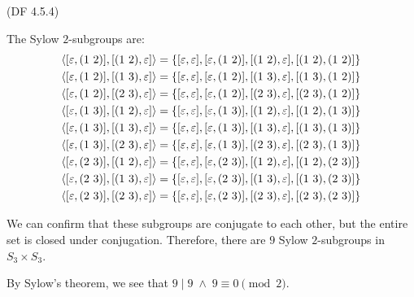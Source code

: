 \begin{problem}{(\textsf{DF 4.5.4})}
\begin{enumalph}
\begin{Answer}
\begin{enumalph}
\begin{enumalph}
                The Sylow $2$-subgroups are:
                \begin{align}
                  \langle [\varepsilon, (1\ 2)], [(1\ 2), \varepsilon] \rangle &= \{[\varepsilon, \varepsilon], [\varepsilon, (1\ 2)], [(1\ 2), \varepsilon], [(1\ 2), (1\ 2)] \} \\
                  \langle [\varepsilon, (1\ 2)], [(1\ 3), \varepsilon] \rangle &= \{[\varepsilon, \varepsilon], [\varepsilon, (1\ 2)], [(1\ 3), \varepsilon], [(1\ 3), (1\ 2)] \} \\
                  \langle [\varepsilon, (1\ 2)], [(2\ 3), \varepsilon] \rangle &= \{[\varepsilon, \varepsilon], [\varepsilon, (1\ 2)], [(2\ 3), \varepsilon], [(2\ 3), (1\ 2)] \} \\
                  \langle [\varepsilon, (1\ 3)], [(1\ 2), \varepsilon] \rangle &= \{[\varepsilon, \varepsilon], [\varepsilon, (1\ 3)], [(1\ 2), \varepsilon], [(1\ 2), (1\ 3)] \} \\
                  \langle [\varepsilon, (1\ 3)], [(1\ 3), \varepsilon] \rangle &= \{[\varepsilon, \varepsilon], [\varepsilon, (1\ 3)], [(1\ 3), \varepsilon], [(1\ 3), (1\ 3)] \} \\
                  \langle [\varepsilon, (1\ 3)], [(2\ 3), \varepsilon] \rangle &= \{[\varepsilon, \varepsilon], [\varepsilon, (1\ 3)], [(2\ 3), \varepsilon], [(2\ 3), (1\ 3)] \} \\
                  \langle [\varepsilon, (2\ 3)], [(1\ 2), \varepsilon] \rangle &= \{[\varepsilon, \varepsilon], [\varepsilon, (2\ 3)], [(1\ 2), \varepsilon], [(1\ 2), (2\ 3)] \} \\
                  \langle [\varepsilon, (2\ 3)], [(1\ 3), \varepsilon] \rangle &= \{[\varepsilon, \varepsilon], [\varepsilon, (2\ 3)], [(1\ 3), \varepsilon], [(1\ 3), (2\ 3)] \} \\
                  \langle [\varepsilon, (2\ 3)], [(2\ 3), \varepsilon] \rangle &= \{[\varepsilon, \varepsilon], [\varepsilon, (2\ 3)], [(2\ 3), \varepsilon], [(2\ 3), (2\ 3)] \}
                \end{align}

                We can confirm that these subgroups are conjugate to each other,
                but the entire set is closed under conjugation.
                Therefore, there are $9$ Sylow $2$-subgroups in $S_3 \times S_3$.
                
                \noindent
                By Sylow's theorem, we see that $9 \mid 9 \; \land \; 9 \equiv 0 \pmod 2$.
  

\end{enumalph}
\end{enumalph}
\end{Answer}
\end{enumalph}
\end{problem}
